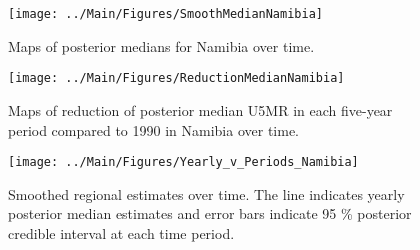 \documentclass[12pt]{article}\usepackage[]{graphicx}\usepackage[]{color}
\newenvironment{knitrout}{}{} %
\begin{document}
\begin{knitrout}
\color{fgcolor}\begin{figure}[bht]

{\centering \texttt{[image: ../Main/Figures/SmoothMedianNamibia]} 

}

\caption[Maps of posterior medians for Namibia  over time]{Maps of posterior medians for Namibia  over time.}\label{fig:unnamed-chunk-244}
\end{figure}


\end{knitrout}
\begin{knitrout}
\color{fgcolor}\begin{figure}[bht]

{\centering \texttt{[image: ../Main/Figures/ReductionMedianNamibia]} 

}

\caption[Maps of reduction of posterior median U5MR in each five-year period compared to 1990 in Namibia over time]{Maps of reduction of posterior median U5MR in each five-year period compared to 1990 in Namibia over time.}\label{fig:unnamed-chunk-245}
\end{figure}


\end{knitrout}
\begin{knitrout}
\color{fgcolor}\begin{figure}[bht]

{\centering \texttt{[image: ../Main/Figures/Yearly\_v\_Periods\_Namibia]} 

}

\caption[Smoothed regional estimates over time]{Smoothed regional estimates over time. The line indicates yearly posterior median estimates and error bars indicate 95 \% posterior credible interval at each time period.}\label{fig:unnamed-chunk-246}
\end{figure}


\end{knitrout}
\end{document}
